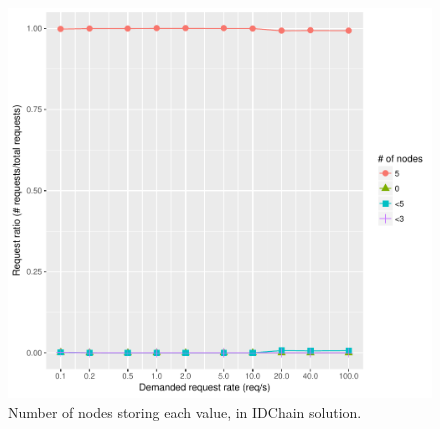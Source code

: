 \begin{figure}
  \centering
  \includegraphics[scale=0.4]{Figures/evaluation/stored-ratio-https-bc.pdf}
  \caption{Number of nodes storing each value, in IDChain solution.}
  \label{fig:stored-ratio-https-bc}
\end{figure}




